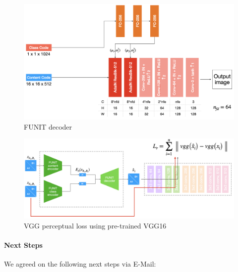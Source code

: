 \documentclass{article}
\begin{document}
\begin{figure}[ht]
	\centering 
	\includegraphics[width=0.95\linewidth]{figures/decoder.png}
	\caption{FUNIT decoder}
	\label{fig:decoder}
\end{figure}

\begin{figure}[ht]
	\centering 
	\includegraphics[width=1.0\linewidth]{figures/vgg_loss.png}
	\caption{VGG perceptual loss using pre-trained VGG16}
	\label{fig:vgg_loss}
\end{figure}

\paragraph{Next Steps}
\newline
We agreed on the following next steps via E-Mail:
\end{document}
